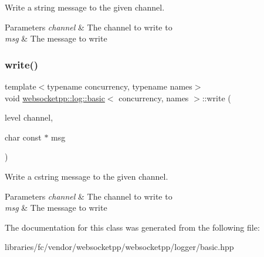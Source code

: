 Write a string message to the given channel. 


\begin{DoxyParams}{Parameters}
{\em channel} & The channel to write to \\
\hline
{\em msg} & The message to write \\
\hline
\end{DoxyParams}
\mbox{\label{classwebsocketpp_1_1log_1_1basic_a693e6a522f654fd131a0c6f8d084c921}} 
\subsubsection{\texorpdfstring{write()}{write()}\hspace{0.1cm}{\footnotesize\ttfamily [2/2]}}
{\footnotesize\ttfamily template$<$typename concurrency, typename names$>$ \\
void \mbox{\hyperlink{classwebsocketpp_1_1log_1_1basic}{websocketpp\+::log\+::basic}}$<$ concurrency, names $>$\+::write (\begin{DoxyParamCaption}\item[{level}]{channel,  }\item[{char const $\ast$}]{msg }\end{DoxyParamCaption})\hspace{0.3cm}{\ttfamily [inline]}}



Write a cstring message to the given channel. 


\begin{DoxyParams}{Parameters}
{\em channel} & The channel to write to \\
\hline
{\em msg} & The message to write \\
\hline
\end{DoxyParams}


The documentation for this class was generated from the following file\+:\begin{DoxyCompactItemize}
\item 
libraries/fc/vendor/websocketpp/websocketpp/logger/basic.\+hpp\end{DoxyCompactItemize}
